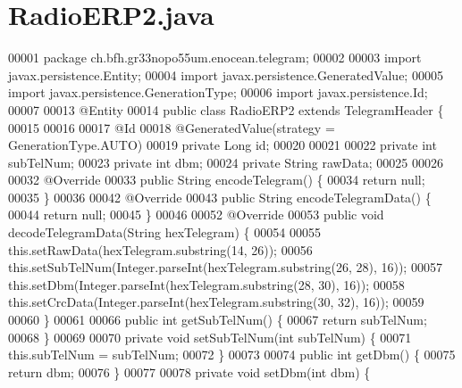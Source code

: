 \section{Radio\+E\+R\+P2.\+java}
\label{RadioERP2_8java_source}

\begin{DoxyCode}
00001 \textcolor{keyword}{package }ch.bfh.gr33nopo55um.enocean.telegram;
00002 
00003 \textcolor{keyword}{import} javax.persistence.Entity;
00004 \textcolor{keyword}{import} javax.persistence.GeneratedValue;
00005 \textcolor{keyword}{import} javax.persistence.GenerationType;
00006 \textcolor{keyword}{import} javax.persistence.Id;
00007 
00013 @Entity
00014 \textcolor{keyword}{public} \textcolor{keyword}{class }RadioERP2 \textcolor{keyword}{extends} TelegramHeader \{
00015 
00016 
00017     @Id
00018     @GeneratedValue(strategy = GenerationType.AUTO)
00019     private Long \textcolor{keywordtype}{id};
00020 
00021 
00022     private \textcolor{keywordtype}{int} subTelNum;
00023     private \textcolor{keywordtype}{int} dbm;
00024     private String rawData;
00025 
00026 
00032     @Override
00033     public String encodeTelegram() \{
00034         \textcolor{keywordflow}{return} null;
00035     \}
00036 
00042     @Override
00043     \textcolor{keyword}{public} String encodeTelegramData() \{
00044         \textcolor{keywordflow}{return} null;
00045     \}
00046 
00052     @Override
00053     \textcolor{keyword}{public} \textcolor{keywordtype}{void} decodeTelegramData(String hexTelegram) \{
00054 
00055         this.setRawData(hexTelegram.substring(14, 26));
00056         this.setSubTelNum(Integer.parseInt(hexTelegram.substring(26, 28), 16));
00057         this.setDbm(Integer.parseInt(hexTelegram.substring(28, 30), 16));
00058         this.setCrcData(Integer.parseInt(hexTelegram.substring(30, 32), 16));
00059 
00060     \}
00061 
00066     \textcolor{keyword}{public} \textcolor{keywordtype}{int} getSubTelNum() \{
00067         \textcolor{keywordflow}{return} subTelNum;
00068     \}
00069 
00070     \textcolor{keyword}{private} \textcolor{keywordtype}{void} setSubTelNum(\textcolor{keywordtype}{int} subTelNum) \{
00071         this.subTelNum = subTelNum;
00072     \}
00073 
00074     \textcolor{keyword}{public} \textcolor{keywordtype}{int} getDbm() \{
00075         \textcolor{keywordflow}{return} dbm;
00076     \}
00077 
00078     \textcolor{keyword}{private} \textcolor{keywordtype}{void} setDbm(\textcolor{keywordtype}{int} dbm) \{

\end{DoxyCode}
